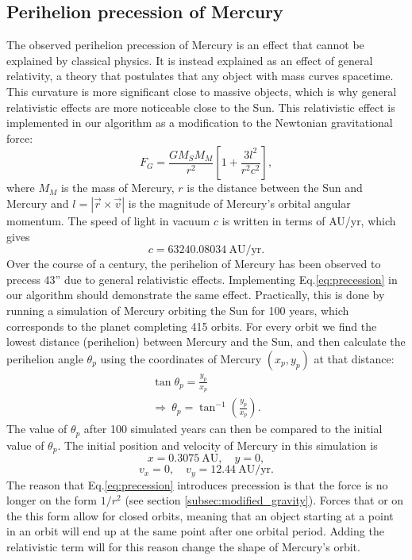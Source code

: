 \documentclass{emulateapj}
\begin{document}
\subsection{Perihelion precession of Mercury}

The observed perihelion precession of Mercury is an effect that cannot be explained by classical physics. It is instead explained as an effect of general relativity, a theory that postulates that any object with mass curves spacetime. This curvature is more significant close to massive objects, which is why general relativistic effects are more noticeable close to the Sun. This relativistic effect is implemented in our algorithm as a modification to the Newtonian gravitational force:
%
\begin{equation}\label{eq:precession}
    F_G = \frac{G M_{S} M_M}{r^2}\left[1 + \frac{3l^2}{r^2 c^2}\right],
\end{equation}
%
where $M_M$ is the mass of Mercury, $r$ is the distance between the Sun and Mercury and $l = \left| \Vec{r} \times \Vec{v}\right|$ is the magnitude of Mercury's orbital angular momentum. The speed of light in vacuum $c$ is written in terms of AU/yr, which gives
%
\begin{equation}
    c = 63240.08034 \ \textrm{AU/yr}.
\end{equation}
%
Over the course of a century, the perihelion of Mercury has been observed to precess 43'' due to general relativistic effects. Implementing Eq.\eqref{eq:precession} in our algorithm should demonstrate the same effect. Practically, this is done by running a simulation of Mercury orbiting the Sun for 100 years, which corresponds to the planet completing 415 orbits. For every orbit we find the lowest distance (perihelion) between Mercury and the Sun, and then calculate the perihelion angle $\theta_p$ using the coordinates of Mercury $(x_p, y_p)$ at that distance:
%
\begin{gather*}
    \tan \theta_p = \frac{y_p}{x_p} \\
    \Rightarrow \ \theta_p = \tan^{-1} \left(\frac{y_p}{x_p}\right).
\end{gather*}
%
The value of $\theta_p$ after 100 simulated years can then be compared to the initial value of $\theta_p$. The initial position and velocity of Mercury in this simulation is 
%
\begin{equation*}
    x = 0.3075 \ \textrm{AU}, \quad y = 0,
\end{equation*}
\begin{equation*}
    v_x = 0, \quad v_y = 12.44 \ \textrm{AU/yr}.
\end{equation*}
%
The reason that Eq.\eqref{eq:precession} introduces precession is that the force is no longer on the form $1/r^2$ (see section \ref{subsec:modified_gravity}). Forces that or on the this form allow for closed orbits, meaning that an object starting at a point in an orbit will end up at the same point after one orbital period. Adding the relativistic term will for this reason change the shape of Mercury's orbit.
\end{document}
